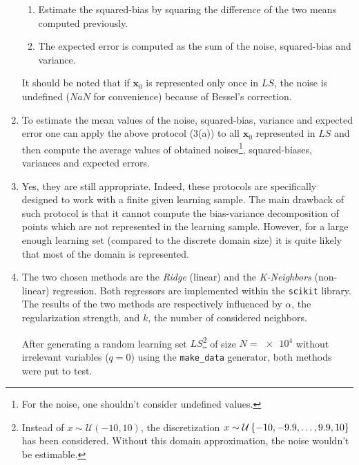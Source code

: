 \documentclass[a4paper, 12pt]{article}
\begin{document}
\begin{enumerate}[label=(\alph*)]
\begin{enumerate}[label=\arabic*.]
            \item Estimate the squared-bias by squaring the difference of the two means computed previously.
            \item The expected error is computed as the sum of the noise, squared-bias and variance.
        \end{enumerate}
        It should be noted that if $\bm{x}_0$ is represented only once in $LS$, the noise is undefined ($NaN$ for convenience) because of Bessel's correction.
        
        \item To estimate the mean values of the noise, squared-bias, variance and expected error one can apply the above protocol (3(a)) to all $\bm{x}_0$ represented in $LS$ and then compute the average values of obtained noises\footnote{For the noise, one shouldn't consider undefined values.}, squared-biases, variances and expected errors.
        
        \item Yes, they are still appropriate. Indeed, these protocols are specifically designed to work with a finite given learning sample. The main drawback of such protocol is that it cannot compute the bias-variance decomposition of points which are not represented in the learning sample. However, for a large enough learning set (compared to the discrete domain size) it is quite likely that most of the domain is represented.
        
        \item The two chosen methods are the \emph{Ridge} (linear) and the \emph{K-Neighbors} (non-linear) regression. Both regressors are implemented within the \texttt{scikit} library. The results of the two methods are respectively influenced by $\alpha$, the regularization strength, and $k$, the number of considered neighbors.
        
        After generating a random learning set $LS$\footnote{Instead of $x \sim \mathcal{U}(-10, 10)$, the discretization $x \sim \mathcal{U}\left\{-10, -9.9, \ldots, 9.9, 10\right\}$ has been considered. Without this domain approximation, the noise wouldn't be estimable.} of size $N = \num{e4}$ without irrelevant variables ($q = 0$) using the \texttt{make\_data} generator, both methods were put to test.


\end{enumerate}
\end{document}
